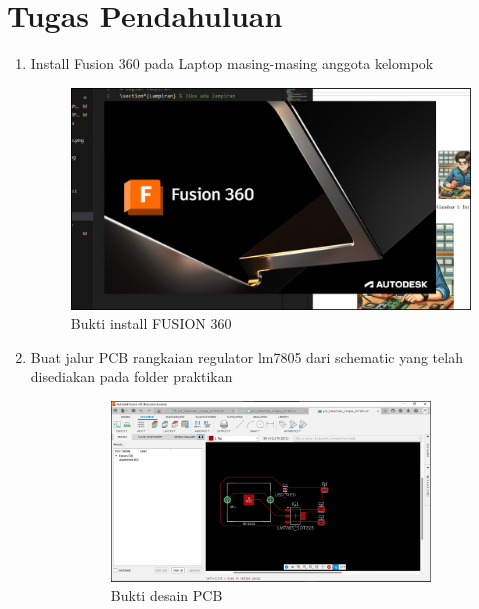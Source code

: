 \section*{Tugas Pendahuluan}
\begin{enumerate}
  \item Install Fusion 360 pada Laptop masing-masing anggota kelompok \\
  \begin{figure}[H]
    \centering
    \includegraphics[width=0.6\linewidth]{img/modul_1/buktidownloadfusion360.jpg}
    \caption{Bukti install FUSION 360} 
  \end{figure}
  \item Buat jalur PCB rangkaian regulator lm7805 dari schematic yang telah disediakan
  pada folder praktikan \\
  \begin{figure}[H]
    \centering
    \begin{subfigure}[b]{0.45\linewidth}
      \centering
      \includegraphics[width=\linewidth]{img/modul_1/pcb_tupen.jpg}
      \caption{Bukti desain PCB\label{fig:inisub1}}
    \end{subfigure}
    \hspace{1cm}
    \begin{subfigure}[b]{0.45\linewidth}

\end{subfigure}
\end{figure}
\end{enumerate}
